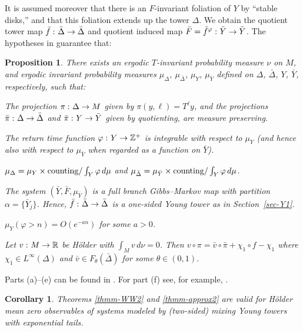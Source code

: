 \documentclass[aop,MSNbibl,seceqn,dvips]{arximspdf}
\newtheorem{prop}[thmm]{Proposition}
\newtheorem{cor}[thmm]{Corollary}
\newcommand{\R}{\mathbb{R}}
\newcommand{\Z}{\mathbb{Z}}
\begin{document}
It is assumed moreover that there is an $F$-invariant foliation of
$Y$ by ``stable disks,'' and that this foliation
extends up the tower $\Delta$. We obtain the quotient tower map
$\bar f\dvtx\bar\Delta\to\bar\Delta$ and quotient induced map
$\bar F=\bar f^\varphi\dvtx\bar Y\to\bar Y$.
The hypotheses in \cite{Young98} guarantee that:

\begin{prop} \label{prop-Y98}
There exists an ergodic $T$-invariant probability measure $\nu$ on $M$,
and ergodic
invariant probability measures $\mu_\Delta$, $\mu_{\bar\Delta}$,
$\mu_Y$, $\mu_{\bar Y}$ defined on $\Delta$, $\bar\Delta$, $Y$,
$\bar Y$,
respectively, such that:
%
\begin{longlist}[(a)]
%
\item[(a)] The projection $\pi\dvtx\Delta\to M$ given by $\pi
(y,\ell
)=T^\ell y$,
and the projections
$\bar\pi\dvtx\Delta\to\bar\Delta$ and $\bar\pi\dvtx Y\to\bar
Y$ given by quotienting,
are measure preserving.
%
\item[(b)] The return time function $\varphi\dvtx Y\to\Z^+$ is integrable
with respect to $\mu_Y$ (and hence also with respect to $\mu_{\bar Y}$
when regarded as a function on $\bar Y$).
%
\item[(c)] $\mu_\Delta=\mu_Y\times{\rm counting}/\int_Y\varphi
\,d\mu$ and
$\mu_{\bar\Delta}=\mu_{\bar Y}\times{\rm counting}/\int_Y\varphi
\,d\mu$.
%
\item[(d)] The system $(\bar Y,\bar F,\mu_{\bar Y})$ is a full branch
Gibbs--Markov map with partition $\alpha=\{\bar Y_j\}$. Hence, $\bar
f\dvtx\bar\Delta\to\bar\Delta$ is a one-sided Young tower as
in Section~\ref{sec-Y1}.
%
\item[(e)] $\mu_Y(\varphi>n)=O(e^{-an})$ for some $a>0$.
%
\item[(f)]
Let $v\dvtx M\to\R$ be H\"older with $\int_M v \,d\nu=0$.
Then $v\circ\pi=\bar v\circ\bar\pi+\chi_1\circ f-\chi_1$ where
$\chi
_1\in L^\infty(\Delta)$
and $\bar v\in F_\theta(\bar\Delta)$ for some $\theta\in(0,1)$.
\end{longlist}
%
\end{prop}

\begin{pf}
Parts (a)--(e) can be found in \cite{Young98}. For part (f) see, for
example, \cite{M07,MN05}.
\end{pf}

\begin{cor} \label{cor-Y98}
Theorems \ref{thmm-WW2} and \ref{thmm-approx2} are valid for H\"older
mean zero observables of systems modeled by (two-sided) mixing Young
towers with exponential tails.
\end{cor}
\end{document}
